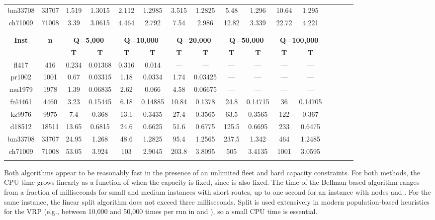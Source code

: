 \documentclass[11pt]{article}
\begin{document}
\begin{table}[p]
{\begin{tabular}{|cc|cc|cc|cc|cc|cc|cc|cc}
bm33708&33707&\num{1.519}&\num{1.3015}&\num{2.112}&\num{1.2985}&\num{3.515}&\num{1.2825}&\num{5.48}&\num{1.296}&\num{10.64}&\num{1.295}\\
ch71009&71008&\num{3.39}&\num{3.0615}&\num{4.464}&\num{2.792}&\num{7.54}&\num{2.986}&\num{12.82}&\num{3.339}&\num{22.72}&\num{4.221}\\
\hline
\multicolumn{12}{c}{}\\
\multicolumn{12}{c}{\vspace*{-0.5cm}}\\
\hline
\multirow{2}{*}{\textbf{Inst}}&\multirow{2}{*}{\textbf{n}}&\multicolumn{2}{c|}{\textbf{Q=5,000}}&\multicolumn{2}{c|}{\textbf{Q=10,000}}&\multicolumn{2}{c|}{\textbf{Q=20,000}}&\multicolumn{2}{c|}{\textbf{Q=50,000}}&\multicolumn{2}{c|}{\textbf{Q=100,000}}\\
&&\textbf{T}&\textbf{T}&\textbf{T}&\textbf{T}&\textbf{T}&\textbf{T}&\textbf{T}&\textbf{T}&\textbf{T}&\textbf{T}\\
\hline
fl417&416&\num{0.234}&\num{0.01368}&\num{0.316}&\num{0.014}&---&---&---&---&---&---\\
pr1002&1001&\num{0.67}&\num{0.03315}&\num{1.18}&\num{0.0334}&\num{1.74}&\num{0.03425}&---&---&---&---\\
mu1979&1978&\num{1.39}&\num{0.06835}&\num{2.62}&\num{0.066}&\num{4.58}&\num{0.06675}&---&---&---&---\\
fnl4461&4460&\num{3.23}&\num{0.15445}&\num{6.18}&\num{0.14885}&\num{10.84}&\num{0.1378}&\num{24.8}&\num{0.14715}&\num{36}&\num{0.14705}\\
kz9976&9975&\num{7.4}&\num{0.368}&\num{13.1}&\num{0.3435}&\num{27.4}&\num{0.3565}&\num{63.5}&\num{0.3565}&\num{122}&\num{0.367}\\
d18512&18511&\num{13.65}&\num{0.6815}&\num{24.6}&\num{0.6625}&\num{51.6}&\num{0.6775}&\num{125.5}&\num{0.6695}&\num{233}&\num{0.6475}\\
bm33708&33707&\num{24.95}&\num{1.268}&\num{48.6}&\num{1.2825}&\num{95.4}&\num{1.2565}&\num{237.5}&\num{1.342}&\num{464}&\num{1.2485}\\
ch71009&71008&\num{53.05}&\num{3.924}&\num{103}&\num{2.9045}&\num{203.8}&\num{3.8095}&\num{505}&\num{3.4135}&\num{1001}&\num{3.0595}\\
\hline
\multicolumn{12}{c}{\vspace*{0.1cm}}
\end{tabular}
}
\endgroup 
\end{table}

Both algorithms appear to be reasonably fast in the presence of an unlimited fleet and hard capacity constraints. For both methods, the CPU time grows linearly as a function of  when the capacity  is fixed, since  is also fixed. The time of the  Bellman-based algorithm ranges from a  fraction of milliseconds for small and medium instances with short routes, up to one second for an instance with  nodes and . For the same instance, the linear split algorithm does not exceed three milliseconds.
Split is used extensively in modern population-based heuristics for the VRP (e.g., between 10,000 and 50,000 times per run in \citealt{Prins2004} and \citealt{Vidal2012}), so a small CPU time is essential.
\end{document}
